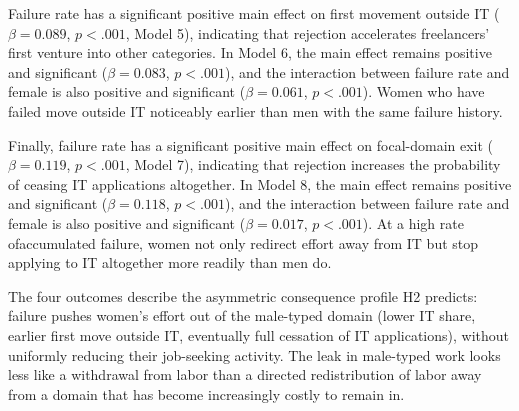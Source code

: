 \documentclass[12pt]{article}
\begin{document}
Failure rate has a significant positive main effect on first movement outside IT ($\beta = 0.089$, $p < .001$, Model 5), indicating that rejection accelerates freelancers' first venture into other categories. In Model 6, the main effect remains positive and significant ($\beta = 0.083$, $p < .001$), and the interaction between failure rate and female is also positive and significant ($\beta = 0.061$, $p < .001$). Women who have failed move outside IT noticeably earlier than men with the same failure history.

Finally, failure rate has a significant positive main effect on focal-domain exit ($\beta = 0.119$, $p < .001$, Model 7), indicating that rejection increases the probability of ceasing IT applications altogether. In Model 8, the main effect remains positive and significant ($\beta = 0.118$, $p < .001$), and the interaction between failure rate and female is also positive and significant ($\beta = 0.017$, $p < .001$). At a high rate ofaccumulated failure, women not only redirect effort away from IT but stop applying to IT altogether more readily than men do.

The four outcomes describe the asymmetric consequence profile H2 predicts: failure pushes women's effort out of the male-typed domain (lower IT share, earlier first move outside IT, eventually full cessation of IT applications), without uniformly reducing their job-seeking activity. The leak in male-typed work looks less like a withdrawal from labor than a directed redistribution of labor away from a domain that has become increasingly costly to remain in.
\end{document}
